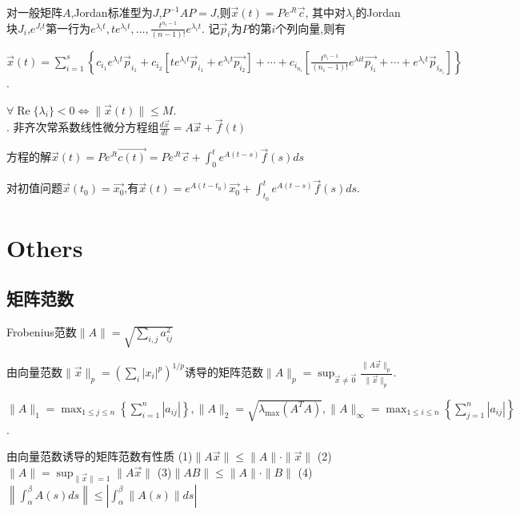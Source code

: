 \documentclass[UTF8]{ctexart}
\begin{document}
对一般矩阵$A$,Jordan标准型为$J$,$P^{-1}AP=J$,则$\vec{x}(t)=Pe^{Jt}\vec{c}$,
其中对$\lambda_i$的Jordan块$J_i$,$e^{J_it}$第一行为$e^{\lambda_it},te^{\lambda_it},\dots ,\frac{t^{n_i-1}}{(n-1)!}e^{\lambda_it}$.
记$\vec{p}_i$为$P$的第$i$个列向量,则有 \par
$\vec{x}(t)= \sum_{i=1}^{s}\left\{c_{i_1}e^{\lambda_it} \vec{p}_{i_1}+c_{i_2}\left[te^{\lambda_it} \vec{p}_{i_1}+e^{\lambda_it}\vec{p_{i_2}}\right]
	+\cdots+c_{i_{n_{i}}}\left[\frac{t^{n_{i}-1}}{\left(n_{i}-1\right)!} e^{\lambda i t} \vec{p_{i_1}}+\cdots+e^{\lambda_it} \vec{p}_{i_{n_{i}}}\right]\right\}$.\par
$\forall \operatorname{Re}\{\lambda_i\}<0 \Leftrightarrow \|\vec{x}(t)\| \leq M$.
~\\

. 非齐次常系数线性微分方程组$\frac{d\vec{x}}{dt}=A\vec{x} +\vec{f}(t)$ \par
方程的解$\vec{x}(t)=Pe^{Jt}\vec{c(t)}=Pe^{Jt}\vec{c}+\int_{0}^te^{A(t-s)}\vec{f}(s)ds$ \par
对初值问题$\vec{x}(t_0)=\vec{x_0}$,有$\vec{x}(t)=e^{A(t-t_0)}\vec{x_0}+\int_{t_0}^te^{A(t-s)}\vec{f}(s)ds$.
~\\


\section{Others}

\subsection{矩阵范数}

Frobenius范数$\| A\|=\sqrt{\sum_{i,j}a_{ij}^2}$

由向量范数$\| \vec{x}\| _p=(\sum _i |x_i|^p)^{1/p}$诱导的矩阵范数$\| A\|_p=\operatorname{sup}
	_{\vec{x}\neq \vec{0}} \frac{\| A\vec{x} \|_p}{\| \vec{x} \|_p}$.


$\|A\|_{1}=\max _{1 \leqslant j \leqslant n}\left\{\sum_{i=1}^{n}\left|a_{i j}\right|\right\},
	\|A\|_{2}=\sqrt{\lambda_{\max} \left(A^T A\right)},
	\|A\|_{\infty}=\max _{1 \leqslant i \leqslant n}\left\{\sum_{j=1}^{n}\left|a_{i j}\right|\right\}$. \par

由向量范数诱导的矩阵范数有性质
(1)$\|A \vec{x}\| \leqslant\|A\| \cdot\|\vec{x}\|$ \quad
(2)$\|A\|=\sup _{\|\vec{x}\|=1}\|A \vec{x}\|$ \quad
(3)$\|A B\| \leqslant\|A\| \cdot\|B\|$ \quad
(4)$\left\|\int_{\alpha}^{\beta} A(s) d s\right\| \leqslant\left|\int_{\alpha}^{\beta}\|A(s)\| d s\right|$
~\\
\end{document}
